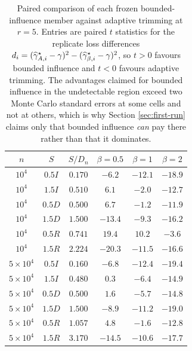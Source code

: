 \begin{table}[t]
\centering
\small
\begin{tabular}{cccccc}
\toprule
$n$ & $S$ & $S/D_n$ & $\beta{=}0.5$ & $\beta{=}1$ & $\beta{=}2$\\
\midrule
$10^4$ & $0.5I$ & $0.170$ & $-6.2$ & $-12.1$ & $-18.9$\\
$10^4$ & $1.5I$ & $0.510$ & $6.1$ & $-2.0$ & $-12.7$\\
$10^4$ & $0.5D$ & $0.500$ & $6.7$ & $-1.2$ & $-11.9$\\
$10^4$ & $1.5D$ & $1.500$ & $-13.4$ & $-9.3$ & $-16.2$\\
$10^4$ & $0.5R$ & $0.741$ & $19.4$ & $10.2$ & $-3.6$\\
$10^4$ & $1.5R$ & $2.224$ & $-20.3$ & $-11.5$ & $-16.6$\\
\midrule
$5{\times}10^4$ & $0.5I$ & $0.160$ & $-6.8$ & $-12.4$ & $-19.4$\\
$5{\times}10^4$ & $1.5I$ & $0.480$ & $0.3$ & $-6.4$ & $-14.9$\\
$5{\times}10^4$ & $0.5D$ & $0.500$ & $1.6$ & $-5.7$ & $-14.8$\\
$5{\times}10^4$ & $1.5D$ & $1.500$ & $-8.9$ & $-11.2$ & $-19.0$\\
$5{\times}10^4$ & $0.5R$ & $1.057$ & $4.8$ & $-1.6$ & $-12.8$\\
$5{\times}10^4$ & $1.5R$ & $3.170$ & $-14.5$ & $-10.6$ & $-17.7$\\
\bottomrule
\end{tabular}
\caption{Paired comparison of each frozen bounded-influence member against adaptive trimming at $r=5$.  Entries are paired $t$ statistics for the replicate loss differences $d_i=(\widehat{\gamma}_{A,i}^\star-\gamma)^2-(\widehat{\gamma}_{\beta,i}^\star-\gamma)^2$, so $t>0$ favours bounded influence and $t<0$ favours adaptive trimming.  The advantages claimed for bounded influence in the undetectable region exceed two Monte Carlo standard errors at some cells and not at others, which is why Section \ref{sec:first-run} claims only that bounded influence \emph{can} pay there rather than that it dominates.}
\label{tab:beta-contrasts}
\end{table}
